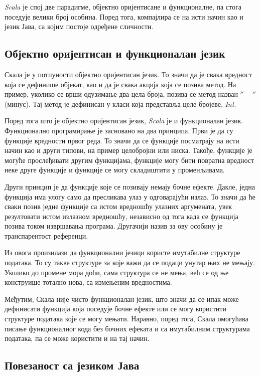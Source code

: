 \documentclass[12pt,oneside]{memoir}
\begin{document}
\textit{Scala} је спој две парадигме, објектно оријентисане и функционалне, па стога поседује велики број особина. Поред тога, компајлира се на исти начин као и језик Јава, са којим постоје одређене сличности.

\subsection{Објектно оријентисан и функционалан језик}
\label{subsec:scala_obj_prog}

Скала је у потпуности објектно оријентисан језик. То значи да је свака вредност која се дефинише објекат, као и да је свака акција која се позива метод. На пример, уколико се врши одузимање два цела броја, позива се метод назван $''-''$ (минус). Тај метод је дефинисан у класи која представља целе бројеве, \textit{Int}. \cite{scala_prog}

Поред тога што је објектно оријентисан језик, \textit{Scala} је и функционалан језик. Функционално програмирање је засновано на два принципа. Први је да су функције вредности првог реда. То значи да се функције посматрају на исти начин као и други типови, на пример целобројни или ниска. Такође, функције је могуће прослеђивати другим функцијама, функције могу бити повратна вредност неке друге функције и функције се могу складиштити у променљивама.

Други принцип је да функције које се позивају немају бочне ефекте. Дакле, једна функција има улогу само да пресликава улаз у одговарајући излаз. То значи да ће сваки позив једне функције са истом вредношћу улазних аргумената, увек резултовати истом излазном вредношћу, независно од тога када се функција позива током извршавања програма. Другачији назив за ову особину је транспарентост референци. \cite{scala_prog}

Из овога произилази да функционални језици користе имутабилне структуре података. То су такве структуре за које важи да се подаци унутар њих не мењају. Уколико до промене мора доћи, сама структура се не мења, већ се од ње конструише тотално нова, са измењеним вредностима. \cite{scala_prog}

Међутим, Скала није чисто функционалан језик, што значи да се ипак може дефинисати функција која поседује бочне ефекте или се могу користити структуре података које се могу мењати. Наравно, поред тога, Скала омогућава писање функционалног кода без бочних ефеката и са имутабилним структурама података, па се може користити и на тај начин. \cite{scala_prog}

\subsection{Повезаност са језиком Јава}
\label{subsec:scala_komp}
\end{document}
